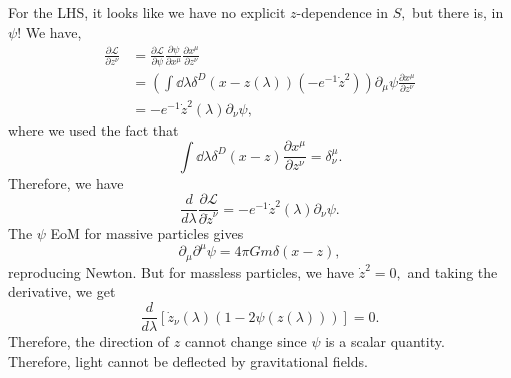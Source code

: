 \documentclass{article}
\numberwithin{equation}{section}
\begin{document}
For the LHS, it looks like we have no explicit $z$-dependence in $S,$ but there is, in $\psi$! We have,
\begin{align}
    \frac{\partial \mathcal{L}}{\partial z^{\nu}} &= \frac{\partial \mathcal{L}}{\partial \psi}\frac{\partial \psi}{\partial x^{\mu}}\frac{\partial x^{\mu}}{\partial z^{\nu}} \\ 
    &= \left(\int \dd{\lambda} \delta^D(x-z(\lambda))(-e^{-1}\dot{z}^2)\right)\partial_{\mu}\psi\frac{\partial x^{\mu}}{\partial z^{\nu}} \\ 
    &= -e^{-1}\dot{z}^2(\lambda)\partial_{\nu}\psi,
\end{align}
where we used the fact that 
\begin{equation}
    \int \dd{\lambda}\delta^D(x-z)\frac{\partial x^{\mu}}{\partial z^{\nu}} = \delta^{\mu}_{\nu}.
\end{equation}
Therefore, we have 
\begin{equation}
    \frac{d}{d\lambda}\frac{\partial\mathcal{L}}{\partial \dot{z}^{\nu}} = -e^{-1}\dot{z}^2(\lambda)\partial_\nu\psi.
\end{equation}
The $\psi$ EoM for massive particles gives
\begin{equation}
    \partial_{\mu}\partial^{\mu}\psi = 4\pi Gm \delta(x-z),
\end{equation}
reproducing Newton. But for massless particles, we have $\dot{z}^2=0,$ and taking the derivative, we get 
\begin{equation}
    \frac{d}{d\lambda}\left[\dot{z}_{\nu}(\lambda)(1-2\psi(z(\lambda)))\right] = 0.
\end{equation}
Therefore, the direction of $z$ cannot change since $\psi$ is a scalar quantity. Therefore, light cannot be deflected by gravitational fields.
\end{document}
